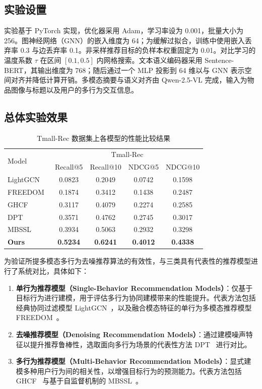 \subsection{实验设置}
实验基于 PyTorch 实现，优化器采用 Adam，学习率设为 0.001，批量大小为 256。图神经网络（GNN）的嵌入维度为 64；为缓解过拟合，训练中使用嵌入丢弃率 0.3 与边丢弃率 0.1。非采样推荐目标的负样本权重固定为 0.01。对比学习的温度系数 $\tau$ 在区间 $[0.1, 0.5]$ 内网格搜索。文本语义编码器采用 Sentence-BERT，其输出维度为 768；随后通过一个 MLP 投影到 64 维以与 GNN 表示空间对齐并降低计算开销。多模态摘要与语义对齐由 Qwen-2.5-VL 完成，输入为物品图像与标题以及用户的多行为交互信息。



\subsection{总体实验效果}

\begin{table}[htbp]
\renewcommand{\arraystretch}{1.0}
\caption{Tmall-Rec 数据集上各模型的性能比较结果}
\centering
\begin{tabular}{l|cccc}
\toprule
\multirow{2}{*}{Model} & \multicolumn{4}{c}{Tmall-Rec}  \\
& Recall@5 & Recall@10 & NDCG@5 & NDCG@10 \\
\midrule
LightGCN~\cite{he2020lightgcn} & 0.0823 & 0.2049 & 0.0742 & 0.1598 \\
FREEDOM~\cite{zhou2023tale} & 0.1874 & 0.3412 & 0.1438 & 0.2487 \\
GHCF~\cite{chen2021GHCF} & 0.3117 & 0.4079 & 0.2274 & 0.2585 \\
DPT~\cite{zhang2023DPT} & 0.3571 & 0.4762 & 0.2745 & 0.3017 \\
MBSSL~\cite{xu2023MBSSL} & 0.3934 & 0.5063 & 0.2932 & 0.3298 \\
\textbf{Ours} & \textbf{0.5234} & \textbf{0.6241} & \textbf{0.4012} & \textbf{0.4338} \\ 
\bottomrule
\end{tabular}
\label{table:Comparison2} 
\end{table}

为验证所提多模态多行为去噪推荐算法的有效性，与三类具有代表性的推荐模型进行了系统对比，具体如下：
\begin{enumerate}
    \item \textbf{单行为推荐模型（Single-Behavior Recommendation Models）}：仅基于目标行为进行建模，用于评估多行为协同建模带来的性能提升。代表方法包括经典协同过滤模型 LightGCN~\cite{he2020lightgcn}，以及融合模态特征的单行为多模态推荐模型 FREEDOM~\cite{zhou2023tale}。
    \item \textbf{去噪推荐模型（Denoising Recommendation Models）}：通过建模噪声特征以提升推荐鲁棒性，选取面向多行为场景的代表性方法 DPT~\cite{zhang2023DPT} 进行对比。
    \item \textbf{多行为推荐模型（Multi-Behavior Recommendation Models）}：显式建模多种用户行为间的相关性，以增强目标行为的预测能力。代表方法包括 GHCF~\cite{chen2021GHCF} 与基于自监督机制的 MBSSL~\cite{xu2023MBSSL}。
\end{enumerate}

